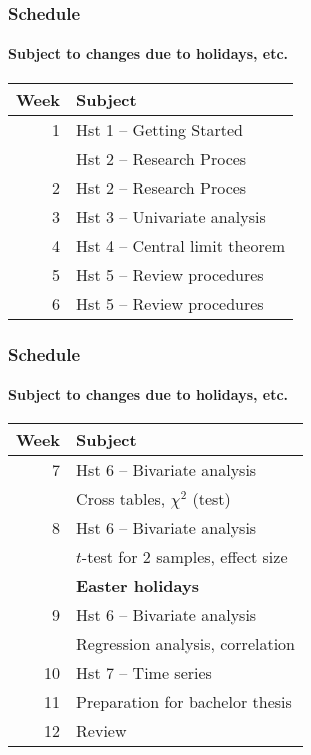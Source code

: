 \documentclass[aspectratio=169]{beamer}
\begin{document}
\begin{frame}
  \frametitle{Schedule}
  \framesubtitle{Subject to changes due to holidays, etc.}
  
  \centering
  \begin{tabular}{rl}
  	\toprule
  	\textbf{Week} & \textbf{Subject}                \\
  	\midrule
  	            1 & Hst 1 -- Getting Started        \\
  	              & Hst 2 -- Research Proces        \\
  	            2 & Hst 2 -- Research Proces        \\
  	            3 & Hst 3 -- Univariate analysis    \\
  	            4 & Hst 4 -- Central limit theorem  \\
  	            5 & Hst 5 -- Review procedures      \\
  	            6 & Hst 5 -- Review procedures      \\
  \end{tabular}
  
\end{frame}

\begin{frame}
  \frametitle{Schedule}
\framesubtitle{Subject to changes due to holidays, etc.}
  
  \centering
  \begin{tabular}{rl}
  	\toprule
  	\textbf{Week} & \textbf{Subject}                                    \\
  	\midrule
  	            7 & Hst 6 -- Bivariate analysis                         \\
  	              & \hspace{1.25cm} Cross tables, $\chi^2$ (test)       \\
  	            8 & Hst 6 -- Bivariate analysis                         \\
  	              & \hspace{1.25cm} $t$-test for 2 samples, effect size \\
  	              & \textbf{Easter holidays}                            \\
  	            9 & Hst 6 -- Bivariate analysis                         \\
  	              & \hspace{1.25cm} Regression analysis, correlation    \\
  	           10 & Hst 7 -- Time series                                \\
  	           11 & Preparation for bachelor thesis                     \\
  	           12 & Review                                              \\
  \end{tabular}
  
\end{frame}
\end{document}
